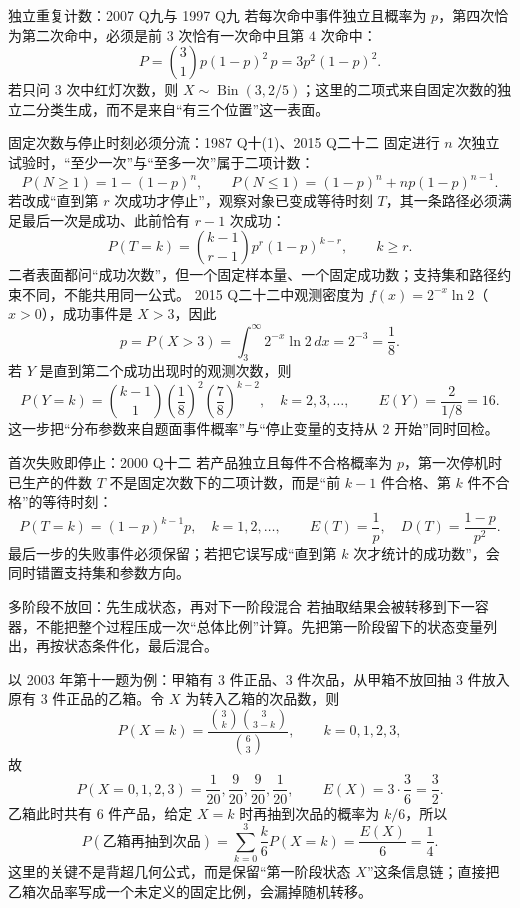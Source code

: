 \documentclass[11pt,a4paper]{ctexart}
\begin{document}
\begin{examplebox}{独立重复计数：2007 Q九与 1997 Q九}
若每次命中事件独立且概率为 $p$，第四次恰为第二次命中，必须是前 $3$ 次恰有一次命中且第 $4$ 次命中：
\[
P=\binom31p(1-p)^2\,p=3p^2(1-p)^2.
\]
若只问 $3$ 次中红灯次数，则 $X\sim\operatorname{Bin}(3,2/5)$；这里的二项式来自固定次数的独立二分类生成，而不是来自“有三个位置”这一表面。
\end{examplebox}

\begin{examplebox}{固定次数与停止时刻必须分流：1987 Q十(1)、2015 Q二十二}
固定进行 $n$ 次独立试验时，“至少一次”与“至多一次”属于二项计数：
\[
P(N\ge1)=1-(1-p)^n,\qquad
P(N\le1)=(1-p)^n+np(1-p)^{n-1}.
\]
若改成“直到第 $r$ 次成功才停止”，观察对象已变成等待时刻 $T$，其一条路径必须满足最后一次是成功、此前恰有 $r-1$ 次成功：
\[
P(T=k)=\binom{k-1}{r-1}p^r(1-p)^{k-r},\qquad k\ge r.
\]
二者表面都问“成功次数”，但一个固定样本量、一个固定成功数；支持集和路径约束不同，不能共用同一公式。
2015 Q二十二中观测密度为 $f(x)=2^{-x}\ln2$（$x>0$），成功事件是 $X>3$，因此
\[
p=P(X>3)=\int_3^\infty2^{-x}\ln2\,dx=2^{-3}=\frac18.
\]
若 $Y$ 是直到第二个成功出现时的观测次数，则
\[
P(Y=k)=\binom{k-1}{1}\left(\frac18\right)^2
\left(\frac78\right)^{k-2},\quad k=2,3,\ldots,
\qquad E(Y)=\frac2{1/8}=16.
\]
这一步把“分布参数来自题面事件概率”与“停止变量的支持从 $2$ 开始”同时回检。
\end{examplebox}

\begin{examplebox}{首次失败即停止：2000 Q十二}
若产品独立且每件不合格概率为 $p$，第一次停机时已生产的件数 $T$ 不是固定次数下的二项计数，而是“前 $k-1$ 件合格、第 $k$ 件不合格”的等待时刻：
\[
P(T=k)=(1-p)^{k-1}p,\quad k=1,2,\ldots,
\qquad E(T)=\frac1p,\quad D(T)=\frac{1-p}{p^2}.
\]
最后一步的失败事件必须保留；若把它误写成“直到第 $k$ 次才统计的成功数”，会同时错置支持集和参数方向。
\end{examplebox}

\begin{methodbox}{多阶段不放回：先生成状态，再对下一阶段混合}
若抽取结果会被转移到下一容器，不能把整个过程压成一次“总体比例”计算。先把第一阶段留下的状态变量列出，再按状态条件化，最后混合。

以 2003 年第十一题为例：甲箱有 $3$ 件正品、$3$ 件次品，从甲箱不放回抽 $3$ 件放入原有 $3$ 件正品的乙箱。令 $X$ 为转入乙箱的次品数，则
\[
P(X=k)=\frac{\binom{3}{k}\binom{3}{3-k}}{\binom{6}{3}},
\qquad k=0,1,2,3,
\]
故
\[
P(X=0,1,2,3)=\frac1{20},\frac9{20},\frac9{20},\frac1{20},
\qquad E(X)=3\cdot\frac36=\frac32.
\]
乙箱此时共有 $6$ 件产品，给定 $X=k$ 时再抽到次品的概率为 $k/6$，所以
\[
P(\text{乙箱再抽到次品})
=\sum_{k=0}^3\frac{k}{6}P(X=k)
=\frac{E(X)}6=\frac14.
\]
这里的关键不是背超几何公式，而是保留“第一阶段状态 $X$”这条信息链；直接把乙箱次品率写成一个未定义的固定比例，会漏掉随机转移。
\end{methodbox}
\end{document}
